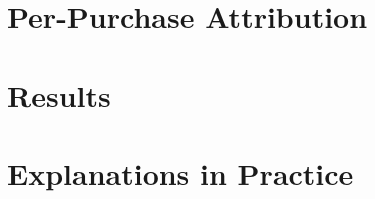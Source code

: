 
\section{Per-Purchase Attribution}
\label{sec:fu-attribution}

\section{Results}
\label{sec:fu-results}

\section{Explanations in Practice}
\label{sec:fu-explanations}
